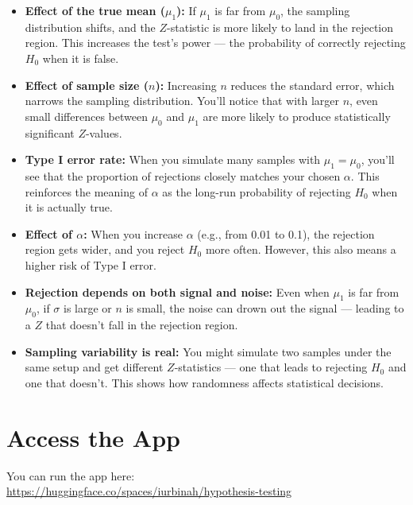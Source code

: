 \documentclass[11pt]{article}
\begin{document}
\begin{itemize}
  \item \textbf{Effect of the true mean ($\mu_1$):} If $\mu_1$ is far from $\mu_0$, the sampling distribution shifts, and the $Z$-statistic is more likely to land in the rejection region. This increases the test's power — the probability of correctly rejecting $H_0$ when it is false.

  \item \textbf{Effect of sample size ($n$):} Increasing $n$ reduces the standard error, which narrows the sampling distribution. You’ll notice that with larger $n$, even small differences between $\mu_0$ and $\mu_1$ are more likely to produce statistically significant $Z$-values.

  \item \textbf{Type I error rate:} When you simulate many samples with $\mu_1 = \mu_0$, you’ll see that the proportion of rejections closely matches your chosen $\alpha$. This reinforces the meaning of $\alpha$ as the long-run probability of rejecting $H_0$ when it is actually true.

  \item \textbf{Effect of $\alpha$:} When you increase $\alpha$ (e.g., from 0.01 to 0.1), the rejection region gets wider, and you reject $H_0$ more often. However, this also means a higher risk of Type I error.

  \item \textbf{Rejection depends on both signal and noise:} Even when $\mu_1$ is far from $\mu_0$, if $\sigma$ is large or $n$ is small, the noise can drown out the signal — leading to a $Z$ that doesn’t fall in the rejection region.

  \item \textbf{Sampling variability is real:} You might simulate two samples under the same setup and get different $Z$-statistics — one that leads to rejecting $H_0$ and one that doesn't. This shows how randomness affects statistical decisions.
\end{itemize}

\section*{Access the App}

You can run the app here: \\
\url{https://huggingface.co/spaces/iurbinah/hypothesis-testing}
\end{document}
